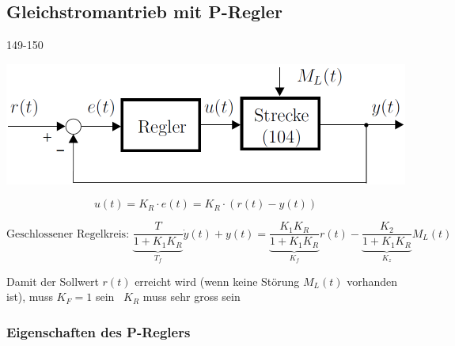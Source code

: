 \subsection{Gleichstromantrieb mit P-Regler}{149-150}
\label{P-Regler}

\begin{minipage}[c]{0.4\columnwidth}
    \includegraphics[width=\columnwidth]{images/gleichstromantrieb_p-regler.png}
\end{minipage}
\hfill
\begin{minipage}[c]{0.48\columnwidth}
    $$ u(t) = K_R \cdot e(t) = K_R \cdot ( r(t) - y(t) )$$
\end{minipage}

$$ \boxed{ \text{Geschlossener Regelkreis: } \underbrace{\frac{T}{1 + K_1 K_R}}_{T_f} \dot{y}(t) + y(t) = \underbrace{\frac{K_1 K_R}{1 + K_1 K_R}}_{K_f} r(t)
    - \underbrace{\frac{K_2}{1 + K_1 K_R}}_{K_z} M_L(t) } $$

Damit der Sollwert $r(t)$ erreicht wird (wenn keine Störung $M_L(t)$ vorhanden ist), muss $K_F = 1$ sein
\textrightarrow\ $K_R$ muss sehr gross sein


\subsubsection{Eigenschaften des P-Reglers}

